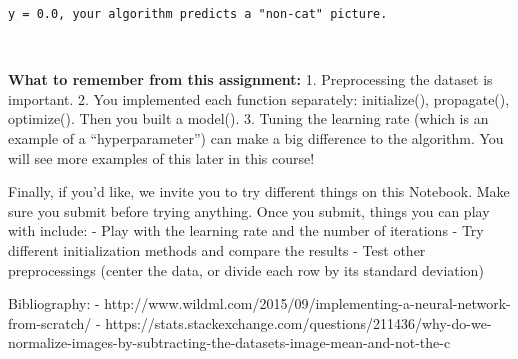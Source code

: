 \documentclass[11pt]{article}
\begin{document}
    \begin{Verbatim}[commandchars=\\\{\}]
y = 0.0, your algorithm predicts a "non-cat" picture.
    \end{Verbatim}

    \begin{center}
    \end{center}
    { \hspace*{\fill} \\}
    
    \textbf{What to remember from this assignment:} 1. Preprocessing the
dataset is important. 2. You implemented each function separately:
initialize(), propagate(), optimize(). Then you built a model(). 3.
Tuning the learning rate (which is an example of a ``hyperparameter'')
can make a big difference to the algorithm. You will see more examples
of this later in this course!

    Finally, if you'd like, we invite you to try different things on this
Notebook. Make sure you submit before trying anything. Once you submit,
things you can play with include: - Play with the learning rate and the
number of iterations - Try different initialization methods and compare
the results - Test other preprocessings (center the data, or divide each
row by its standard deviation)

    Bibliography: -
http://www.wildml.com/2015/09/implementing-a-neural-network-from-scratch/
-
https://stats.stackexchange.com/questions/211436/why-do-we-normalize-images-by-subtracting-the-datasets-image-mean-and-not-the-c


    
    
    
\end{document}
